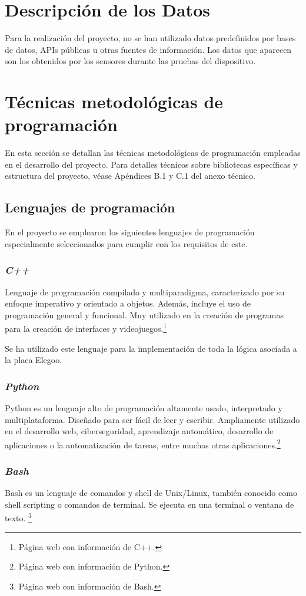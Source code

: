 
\section{Descripción de los Datos}
Para la realización del proyecto, no se han utilizado datos predefinidos por bases de datos, APIs públicas u otras fuentes de información. Los datos que aparecen son los obtenidos por los sensores durante las pruebas del dispositivo.
\section{Técnicas metodológicas de programación}
En esta sección se detallan las técnicas metodológicas de programación empleadas en el desarrollo del proyecto. Para detalles técnicos sobre bibliotecas específicas y estructura del proyecto, véase Apéndices B.1 y C.1 del anexo técnico.

\subsection{Lenguajes de programación}
En el proyecto se emplearon los siguientes lenguajes de programación especialmente seleccionados para cumplir con los requisitos de este.
\subsubsection{\textit{C++}}
Lenguaje de programación compilado y multiparadigma, caracterizado por su enfoque imperativo y orientado a objetos. Además, incluye el uso de programación general y funcional.
Muy utilizado en la creación de programas para la creación de interfaces y videojuegos.\cite{C++}\footnote{Página web con información de C++\cite{C++}.}

Se ha utilizado este lenguaje para la implementación de toda la lógica asociada a la placa Elegoo.
\subsubsection{\textit{Python}}
Python es un lenguaje alto de programación altamente usado, interpretado y multiplataforma. Diseñado para ser fácil de leer y escribir.
Ampliamente utilizado en el desarrollo web, ciberseguridad, aprendizaje automático, desarrollo de aplicaciones o la automatización de tareas, entre muchas otras aplicaciones.\cite{Python}\footnote{Página web con información de Python\cite{Python}.}
\subsubsection{\textit{Bash}}
Bash es un lenguaje de comandos y shell de Unix/Linux, también conocido como shell scripting o comandos de terminal.
Se ejecuta en una terminal o ventana de texto. \cite{Bash}\footnote{Página web con información de Bash\cite{Bash}.}

